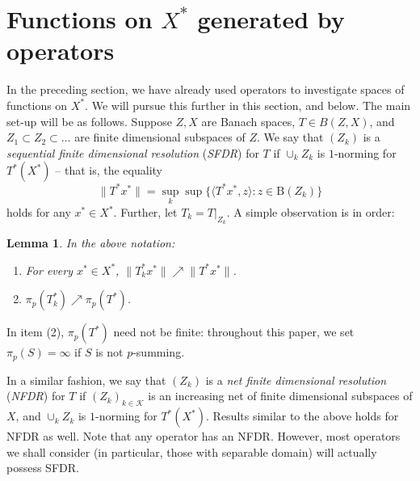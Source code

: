 \documentclass{amsart}
\theoremstyle{plain}
\newtheorem{lemma}[theorem]{Lemma}
\theoremstyle{definition}
\newtheorem{remark}[theorem]{Remark}
\numberwithin{equation}{section}
\newcommand{\ball}{\mathrm{B}}
\begin{document}
\section{Functions on $X^*$ generated by operators}\label{operators:general}

In the preceding section, we have already used operators to investigate spaces of functions on $X^*$. We will pursue this further in this section, and below.
The main set-up will be as follows. Suppose $Z, X$ are Banach spaces, $T \in B(Z,X)$, and $Z_1 \subset Z_2 \subset \ldots$ are finite dimensional subspaces of $Z$. We say that $(Z_k)$ is a \emph{sequential finite dimensional resolution} (\emph{SFDR}) for $T$ if $\cup_k Z_k$ is $1$-norming for $T^*(X^*)$ -- that is, the equality
$$
\|T^* x^*\| = \sup_k \sup \big\{ \langle T^* x^*, z \rangle : z \in \ball(Z_k) \big\} 
$$
holds for any $x^* \in X^*$. Further, let $T_k = T \big|_{Z_k}$. A simple observation is in order:

\begin{lemma}\label{l:simple properties}
In the above notation:
\begin{enumerate}
    \item For every $x^* \in X^*$, $\|T_k^* x^*\| \nearrow \|T^* x^*\|$.
    \item $\pi_p(T_k^*) \nearrow \pi_p(T^*)$.
\end{enumerate}
\end{lemma}

In item (2), $\pi_p(T^*)$ need not be finite: throughout this paper, we set $\pi_p(S) = \infty$ if $S$ is not $p$-summing.

In a similar fashion, we say that $(Z_k)$ is a \emph{net finite dimensional resolution} (\emph{NFDR}) for $T$ if $(Z_k)_{k \in {\mathcal K}}$ is an increasing net of finite dimensional subspaces of $X$, and $\cup_k Z_k$ is $1$-norming for $T^*(X^*)$.
Results similar to the above holds for NFDR as well. Note that any operator has an NFDR. However, most operators we shall consider (in particular, those with separable domain) will actually possess SFDR.

\end{document}
